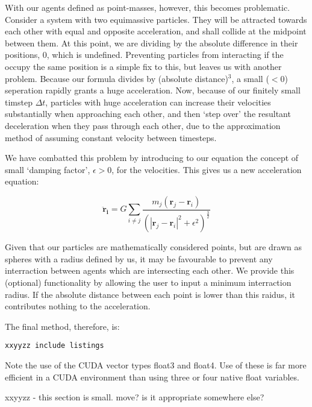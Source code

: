 \documentclass[11pt,a4paper]{article}
\begin{document}
With our agents defined as point-masses, however, this becomes problematic. Consider a system with two equimassive particles. They will be attracted towards each other with equal and opposite acceleration, and shall collide at the midpoint between them. At this point, we are dividing by the absolute difference in their positions, $0$, which is undefined. Preventing particles from interacting if the occupy the same position is a simple fix to this, but leaves us with another problem. Because our formula divides by (absolute distance)$^3$, a small ($<0$) seperation rapidly grants a huge acceleration. Now, because of our finitely small timstep $\Delta t$, particles with huge acceleration can increase their velocities substantially when approaching each other, and then `step over' the resultant deceleration when they pass through each other, due to the approximation method of assuming constant velocity between timesteps.

We have combatted this problem by introducing to our equation the concept of small `damping factor', $\epsilon >0$, for the velocities\cite{cudaNbody}. This gives us a new acceleration equation:
\begin{center}
\begin{equation}
\mathbf{\ddot r_{i}}=G\sum_{i\neq j}\frac{m_{j}(\mathbf r_{j}-\mathbf r_{i})}{(|\mathbf r_{j}-\mathbf r_{i}|^2+\epsilon^2)^\frac{3}{2}}
\end{equation}
\end{center}

\noindent Given that our particles are mathematically considered points, but are drawn as spheres with a radius defined by us, it may be favourable to prevent any interraction between agents which are intersecting each other. We provide this (optional) functionality by allowing the user to input a minimum interraction radius. If the absolute distance between each point is lower than this raidus, it contributes nothing to the acceleration.

The final method, therefore, is:
\begin{lstlisting}
xxyyzz include listings
\end{lstlisting}

Note the use of the CUDA vector types float3 and float4. Use of these is far more efficient in a CUDA environment than using three or four native float variables.\cite{xxyyzz}

xxyyzz - this section is small. move? is it appropriate somewhere else?
\end{document}
